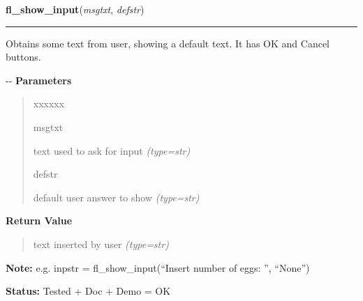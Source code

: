 \hspace{.8\funcindent}\begin{boxedminipage}{\funcwidth}

    \raggedright \textbf{fl\_show\_input}(\textit{msgtxt}, \textit{defstr})

    \vspace{-1.5ex}

    \rule{\textwidth}{0.5\fboxrule}
\setlength{\parskip}{2ex}

Obtains some text from user, showing a default text. It has OK
and Cancel buttons.

-{}-
\setlength{\parskip}{1ex}
      \textbf{Parameters}
      \vspace{-1ex}

      \begin{quote}
        \begin{Ventry}{xxxxxx}

          \item[msgtxt]


text used to ask for input
            {\it (type=str)}

          \item[defstr]


default user answer to show
            {\it (type=str)}

        \end{Ventry}

      \end{quote}

      \textbf{Return Value}
    \vspace{-1ex}

      \begin{quote}

text inserted by user
      {\it (type=str)}

      \end{quote}

\textbf{Note:} 
e.g. inpstr = fl\_show\_input(``Insert number of eggs: '', ``None'')


\textbf{Status:} 
Tested + Doc + Demo = OK


    \end{boxedminipage}

    \label{xformslib:flgoodies:fl_hide_input}

    \vspace{0.5ex}

